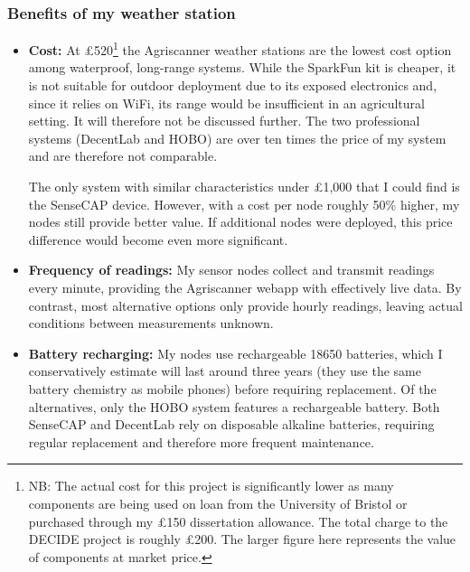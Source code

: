 \subsubsection{Benefits of my weather station}

\begin{itemize}
  \item \textbf{Cost:} At £520\footnote{NB: The actual cost for this project is
        significantly lower as many components are being used on loan from the
        University of Bristol or purchased through my £150 dissertation
        allowance. The total charge to the DECIDE project is roughly £200. The
        larger figure here represents the value of components at market
        price.} the Agriscanner weather stations are the lowest cost option
        among waterproof, long-range systems. While the SparkFun kit is cheaper,
        it is not suitable for outdoor deployment due to its exposed electronics
        and, since it relies on WiFi, its range would be insufficient in an
        agricultural setting. It will therefore not be discussed further. The
        two professional systems (DecentLab and HOBO) are over ten times the
        price of my system and are therefore not comparable.

        The only system with similar characteristics under £1,000 that I could
        find is the SenseCAP device. However, with a cost per node roughly 50\%
        higher, my nodes still provide better value. If additional nodes were
        deployed, this price difference would become even more significant.

  \item \textbf{Frequency of readings:} My sensor nodes collect and transmit
        readings every minute, providing the Agriscanner webapp with effectively
        live data. By contrast, most alternative options only provide hourly
        readings, leaving actual conditions between measurements unknown.

  \item \textbf{Battery recharging:} My nodes use rechargeable 18650 batteries,
        which I conservatively estimate will last around three years (they use
        the same battery chemistry as mobile phones) before requiring
        replacement. Of the alternatives, only the HOBO system features a
        rechargeable battery. Both SenseCAP and DecentLab rely on disposable
        alkaline batteries, requiring regular replacement and therefore more
        frequent maintenance.


\end{itemize}
